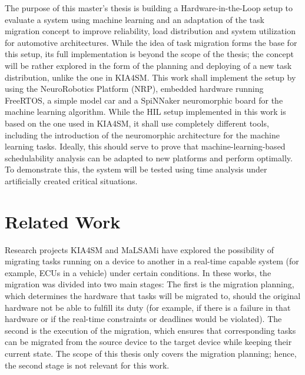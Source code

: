The purpose of this master’s thesis is building a Hardware-in-the-Loop setup to evaluate a system using machine learning and an adaptation of the task migration concept to improve reliability, load distribution and system utilization for automotive architectures. While the idea of task migration forms the base for this setup, its full implementation is beyond the scope of the thesis; the concept will be rather explored in the form of the planning and deploying of a new task distribution, unlike the one in KIA4SM. This work shall implement the setup by using the NeuroRobotics Platform (NRP), embedded hardware running FreeRTOS, a simple model car and a SpiNNaker neuromorphic board for the machine learning algorithm. While the HIL setup implemented in this work is based on the one used in KIA4SM, it shall use completely different tools, including the introduction of the neuromorphic architecture for the machine learning tasks. Ideally, this should serve to prove that machine-learning-based schedulability analysis can be adapted to new platforms and perform optimally. To demonstrate this, the system will be tested using time analysis under artificially created critical situations.

\section*{Related Work}\label{section:relatedwork}
Research projects KIA4SM and MaLSAMi have explored the possibility of migrating tasks running on a device to another in a real-time capable system (for example, ECUs in a vehicle) under certain conditions. In these works, the migration was divided into two main stages: The first is the migration planning, which determines the hardware that tasks will be migrated to, should the original hardware not be able to fulfill its duty (for example, if there is a failure in that hardware or if the real-time constraints or deadlines would be violated). The second is the execution of the migration, which ensures that corresponding tasks can be migrated from the source device to the target device while keeping their current state. The scope of this thesis only covers the migration planning; hence, the second stage is not relevant for this work.

